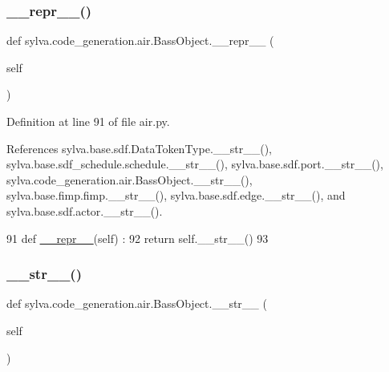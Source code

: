 \subsubsection{\texorpdfstring{\+\_\+\+\_\+repr\+\_\+\+\_\+()}{\_\_repr\_\_()}}
{\footnotesize\ttfamily def sylva.\+code\+\_\+generation.\+air.\+Bass\+Object.\+\_\+\+\_\+repr\+\_\+\+\_\+ (\begin{DoxyParamCaption}\item[{}]{self }\end{DoxyParamCaption})\hspace{0.3cm}{\ttfamily [inherited]}}



Definition at line 91 of file air.\+py.



References sylva.\+base.\+sdf.\+Data\+Token\+Type.\+\_\+\+\_\+str\+\_\+\+\_\+(), sylva.\+base.\+sdf\+\_\+schedule.\+schedule.\+\_\+\+\_\+str\+\_\+\+\_\+(), sylva.\+base.\+sdf.\+port.\+\_\+\+\_\+str\+\_\+\+\_\+(), sylva.\+code\+\_\+generation.\+air.\+Bass\+Object.\+\_\+\+\_\+str\+\_\+\+\_\+(), sylva.\+base.\+fimp.\+fimp.\+\_\+\+\_\+str\+\_\+\+\_\+(), sylva.\+base.\+sdf.\+edge.\+\_\+\+\_\+str\+\_\+\+\_\+(), and sylva.\+base.\+sdf.\+actor.\+\_\+\+\_\+str\+\_\+\+\_\+().


\begin{DoxyCode}
91   \textcolor{keyword}{def }\hyperlink{namespacesylva_1_1code__generation_1_1floorplanner_a84f24b1e40f5425e9bb40ab45ccbd10f}{\_\_repr\_\_}(self) :
92     \textcolor{keywordflow}{return} self.\_\_str\_\_()
93 
\end{DoxyCode}
\mbox{\label{classsylva_1_1code__generation_1_1air_1_1_bass_object_a2c164720220479369c29db97b67aabe8}} 
\subsubsection{\texorpdfstring{\+\_\+\+\_\+str\+\_\+\+\_\+()}{\_\_str\_\_()}}
{\footnotesize\ttfamily def sylva.\+code\+\_\+generation.\+air.\+Bass\+Object.\+\_\+\+\_\+str\+\_\+\+\_\+ (\begin{DoxyParamCaption}\item[{}]{self }\end{DoxyParamCaption})\hspace{0.3cm}{\ttfamily [inherited]}}



